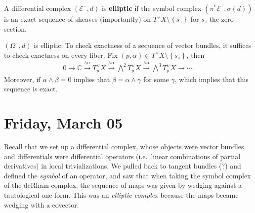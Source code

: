 \begin{definition}

A differential complex \(({\mathcal{E}}^{{\,\cdot\,}}, d)\) is
\textbf{elliptic} if the symbol complex
\((\pi^* {\mathcal{E}}^{{\,\cdot\,}}, \sigma(d))\) is an exact sequence
of sheaves (importantly) on \(T^\vee X \setminus\left\{{s_z}\right\}\)
for \(s_z\) the zero section.

\end{definition}

\begin{claim}

\(({\Omega}^{{\,\cdot\,}}, d)\) is elliptic. To check exactness of a
sequence of vector bundles, it suffices to check exactness on every
fiber. Fix \((p, \alpha) \in T^\vee X \setminus\left\{{ s_z }\right\}\),
then
\begin{align*}
0 \to {\mathbb{C}}\xrightarrow{\wedge \alpha}  T^\vee_p X \xrightarrow{\wedge \alpha}  \bigwedge^2 T_p^\vee X \xrightarrow{\wedge \alpha}  \bigwedge^3 T_p^\vee X \to \cdots
.\end{align*}
Moreover, if \(\alpha\wedge \beta = 0\) implies that
\(\beta = \alpha\wedge \gamma\) for some \(\gamma\), which implies that
this sequence is exact.

\end{claim}

\hypertarget{friday-march-05}{%
\section{Friday, March 05}\label{friday-march-05}}

\begin{remark}

Recall that we set up a differential complex, whose objects were vector
bundles and differentials were differential operators (i.e.~linear
combinations of partial derivatives) in local trivializations. We pulled
back to tangent bundles (?) and defined the \emph{symbol} of an
operator, and saw that when taking the symbol complex of the deRham
complex. the sequence of maps was given by wedging against a
tautological one-form. This was an \emph{elliptic complex} because the
maps became wedging with a covector.

\end{remark}

